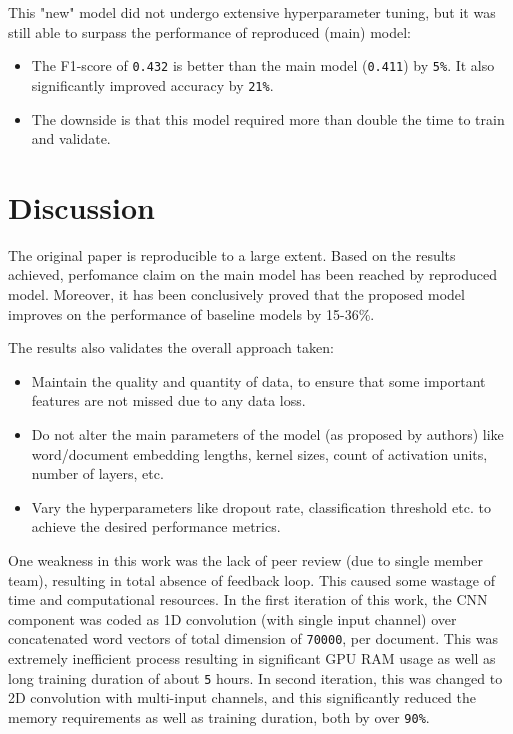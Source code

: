 \documentclass[11pt,a4paper]{article}
\begin{document}
This "new" model did not undergo extensive hyperparameter tuning, but it was still able to surpass the performance of reproduced (main) model:

\begin{itemize}
	\item The F1-score of \texttt{0.432} is better than the main model (\texttt{0.411}) by \texttt{5\%}. It also significantly improved accuracy by \texttt{21\%}.
	\item The downside is that this model required more than double the time to train and validate.
\end{itemize}

\section{Discussion}

The original paper is reproducible to a large extent. Based on the results achieved, perfomance claim on the main model has been reached by reproduced model. Moreover, it has been conclusively proved that the proposed model improves on the performance of baseline models by 15-36\%.

The results also validates the overall approach taken:
\begin{itemize}
	\item Maintain the quality and quantity of data, to ensure that some important features are not missed due to any data loss.
	\item Do not alter the main parameters of the model (as proposed by authors) like word/document embedding lengths, kernel sizes, count of activation units, number of layers, etc.
	\item Vary the hyperparameters like dropout rate, classification threshold etc. to achieve the desired performance metrics. 
\end{itemize}

One weakness in this work was the lack of peer review (due to single member team), resulting in total absence of feedback loop. This caused some wastage of time and computational resources. In the first iteration of this work, the CNN component was coded as 1D convolution (with single input channel) over  concatenated word vectors of total dimension of \texttt{70000}, per document. This was extremely inefficient process resulting in significant GPU RAM usage as well as long training duration of about \texttt{5} hours. In second iteration, this was changed to 2D convolution with multi-input channels, and this significantly reduced the memory requirements as well as training duration, both by over \texttt{90\%}.
\end{document}
